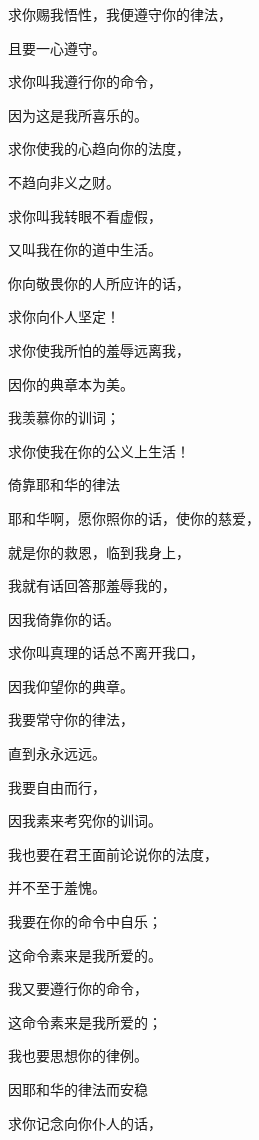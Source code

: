 {\par }{\Q {}求你赐我悟性，我便遵守你的律法，
\par }{\Q 且要一心遵守。
\par }{\Q {}求你叫我遵行你的命令，
\par }{\Q 因为这是我所喜乐的。
\par }{\Q {}求你使我的心趋向你的法度，
\par }{\Q 不趋向非义之财。
\par }{\Q {}求你叫我转眼不看虚假，
\par }{\Q 又叫我在你的道中生活。
\par }{\Q {}你向敬畏你的人所应许的话，
\par }{\Q 求你向仆人坚定！
\par }{\Q {}求你使我所怕的羞辱远离我，
\par }{\Q 因你的典章本为美。
\par }{\Q {}我羡慕你的训词；
\par }{\Q 求你使我在你的公义上生活！
\par }{\SH 倚靠耶和华的律法
\par }{\Q {}耶和华啊，愿你照你的话，使你的慈爱，
\par }{\Q 就是你的救恩，临到我身上，
\par }{\Q {}我就有话回答那羞辱我的，
\par }{\Q 因我倚靠你的话。
\par }{\Q {}求你叫真理的话总不离开我口，
\par }{\Q 因我仰望你的典章。
\par }{\Q {}我要常守你的律法，
\par }{\Q 直到永永远远。
\par }{\Q {}我要自由而行，
\par }{\Q 因我素来考究你的训词。
\par }{\Q {}我也要在君王面前论说你的法度，
\par }{\Q 并不至于羞愧。
\par }{\Q {}我要在你的命令中自乐；
\par }{\Q 这命令素来是我所爱的。
\par }{\Q {}我又要遵行你的命令，
\par }{\Q 这命令素来是我所爱的；
\par }{\Q 我也要思想你的律例。
\par }{\SH 因耶和华的律法而安稳
\par }{\Q {}求你记念向你仆人{}的话，
}

